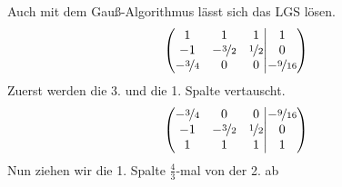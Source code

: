 \documentclass[11pt,a4paper,DIV=12]{scrartcl}
\begin{document}
%
%
%
Auch mit dem Gauß-Algorithmus lässt sich das LGS lösen.
%
%
%
\begin{gather}
	\left\lparen
	\begin{matrix}
		1 & 1 & 1 \\
		-1 & -\nicefrac{3}{2} & \nicefrac{1}{2} \\
		-\nicefrac{3}{4} & 0 & 0
	\end{matrix}
	\middle\vert
	\begin{matrix}
		1 \\
		0 \\
		-\nicefrac{9}{16}
	\end{matrix}
	\right\rparen
\end{gather}
%
%
%
Zuerst werden die 3. und die 1. Spalte vertauscht.
%
%
%
\begin{gather}
	\left\lparen
	\begin{matrix}
		-\nicefrac{3}{4} & 0 & 0 \\
		-1 & -\nicefrac{3}{2} & \nicefrac{1}{2} \\
		1 & 1 & 1
	\end{matrix}
	\middle\vert
	\begin{matrix}
		-\nicefrac{9}{16} \\
		0 \\
		1
	\end{matrix}
	\right\rparen
\end{gather}
%
%
%
Nun ziehen wir die 1. Spalte $\frac{4}{3}$-mal von der 2. ab
\end{document}
